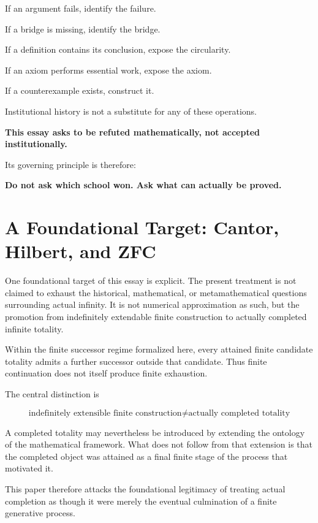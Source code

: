 \documentclass[11pt,a4paper]{article}
\begin{document}
If an argument fails, identify the failure.

If a bridge is missing, identify the bridge.

If a definition contains its conclusion, expose the circularity.

If an axiom performs essential work, expose the axiom.

If a counterexample exists, construct it.

Institutional history is not a substitute for any of these operations.

\begin{center}
\textbf{This essay asks to be refuted mathematically, not accepted
institutionally.}
\end{center}

Its governing principle is therefore:

\begin{center}
\textbf{Do not ask which school won. Ask what can actually be proved.}
\end{center}


\section{A Foundational Target: Cantor, Hilbert, and ZFC}

One foundational target of this essay is explicit. The present
treatment is not claimed to exhaust the historical, mathematical, or
metamathematical questions surrounding actual infinity. It is not numerical
approximation as such, but the promotion from indefinitely extendable
finite construction to actually completed infinite totality.

Within the finite successor regime formalized here, every attained
finite candidate totality admits a further successor outside that
candidate. Thus finite continuation does not itself produce finite
exhaustion.

The central distinction is

\[
\boxed{
\text{indefinitely extensible finite construction}
\neq
\text{actually completed totality}
}
\]

A completed totality may nevertheless be introduced by extending the
ontology of the mathematical framework. What does not follow from that
extension is that the completed object was attained as a final finite
stage of the process that motivated it.

This paper therefore attacks the foundational legitimacy of treating
actual completion as though it were merely the eventual culmination of
a finite generative process.
\end{document}
